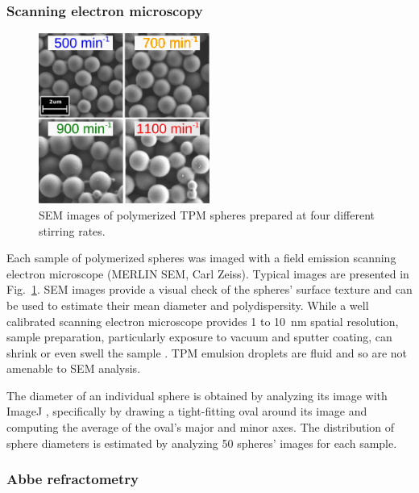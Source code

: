 \documentclass[journal=langd5,manuscript=article]{achemso}
\begin{document}
\subsubsection{Scanning electron microscopy}

\begin{figure}
  \centering
  \includegraphics[width=0.5\textwidth]{semimages03}
  \caption{SEM images of polymerized TPM spheres
    prepared at four different stirring rates.}
  \label{fig:semimages}
\end{figure}

Each sample of polymerized spheres was imaged with a 
field emission scanning electron microscope
(MERLIN SEM, Carl Zeiss).
Typical images are presented in Fig.~\ref{fig:semimages}.
SEM images provide a visual check of the spheres' surface
texture and can be used to estimate their mean
diameter and polydispersity.
While a well calibrated scanning
electron microscope provides \num{1} to \SI{10}{\nm} spatial resolution, sample
preparation, particularly exposure to vacuum and sputter coating, can shrink or 
even swell the sample \cite{yamada85,jung02}.
TPM emulsion droplets are fluid and so
are not amenable to SEM analysis.

The diameter of an individual sphere is obtained 
by analyzing its image with ImageJ \cite{schindelin2015imagej}, specifically by
drawing a tight-fitting oval around its image and
computing the average of the oval's major and minor axes.
The distribution of sphere diameters is
estimated by analyzing \num{50} spheres' images
for each sample.

\subsubsection{Abbe refractometry}
\end{document}
